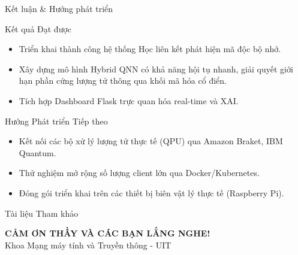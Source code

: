 \documentclass[10pt]{beamer}
\begin{document}
\begin{frame}{Kết luận \& Hướng phát triển}
    \begin{block}{Kết quả Đạt được}
        \begin{itemize}
            \item Triển khai thành công hệ thống Học liên kết phát hiện mã độc bộ nhớ.
            \item Xây dựng mô hình Hybrid QNN có khả năng hội tụ nhanh, giải quyết giới hạn phần cứng lượng tử thông qua khối mã hóa cổ điển.
            \item Tích hợp Dashboard Flask trực quan hóa real-time và XAI.
        \end{itemize}
    \end{block}
    \begin{block}{Hướng Phát triển Tiếp theo}
        \begin{itemize}
            \item Kết nối các bộ xử lý lượng tử thực tế (QPU) qua Amazon Braket, IBM Quantum.
            \item Thử nghiệm mở rộng số lượng client lớn qua Docker/Kubernetes.
            \item Đóng gói triển khai trên các thiết bị biên vật lý thực tế (Raspberry Pi).
        \end{itemize}
    \end{block}
\end{frame}

\begin{frame}[allowframebreaks]{Tài liệu Tham khảo}
    \nocite{*}
    
    
\end{frame}

\begin{frame}
    \centering
    \Huge \color{UITnavy} \textbf{CẢM ƠN THẦY VÀ CÁC BẠN LẮNG NGHE!}\\
    \vspace{1cm}
    \normalsize Khoa Mạng máy tính và Truyền thông - UIT
\end{frame}
\end{document}
